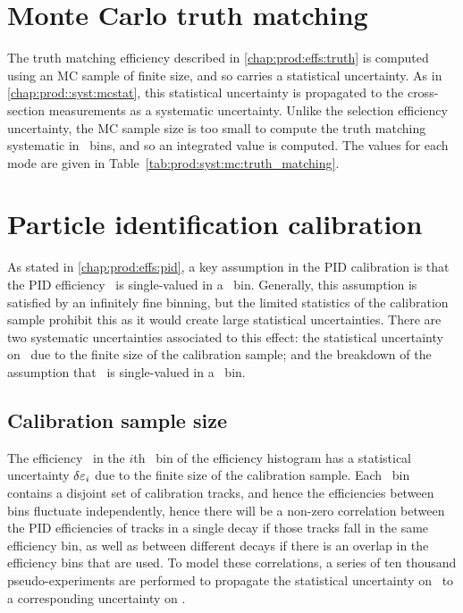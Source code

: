\section{Monte Carlo truth matching}
\label{chap:prod:syst:mc:truth_matching}

The truth matching efficiency described in \cref{chap:prod:effs:truth} is computed using an \ac{MC} 
sample of finite size, and so carries a statistical uncertainty.
As in \cref{chap:prod::syst:mcstat}, this statistical uncertainty is propagated to the cross-section 
measurements as a systematic uncertainty.
Unlike the selection efficiency uncertainty, the \ac{MC} sample size is too 
small to compute the truth matching systematic in \pTy\ bins, and so an 
integrated value is computed.
The values for each mode are given in Table~\ref{tab:prod:syst:mc:truth_matching}.

\section{Particle identification calibration}
\label{chap:prod:syst:pid}

As stated in \cref{chap:prod:effs:pid}, a key assumption in the \ac{PID} 
calibration is that the \ac{PID} efficiency \effpid\ is single-valued in a 
\ptotetanspd\ bin.
Generally, this assumption is satisfied by an infinitely fine binning, but the 
limited statistics of the calibration sample prohibit this as it would create 
large statistical uncertainties.
There are two systematic uncertainties associated to this effect: the 
statistical uncertainty on \effpid\ due to the finite size of the calibration 
sample; and the breakdown of the assumption that \effpid\ is single-valued in a 
\ptotetanspd\ bin.

\subsection{Calibration sample size}
\label{chap:prod:syst:pid:stat}

The efficiency \effi\ in the $i$th \ptotetanspd\ bin of the efficiency 
histogram has a statistical uncertainty $\delta{\ensuremath{\varepsilon_{i}}}$ due to the finite size of 
the calibration sample.
Each \ptotetanspd\ bin contains a disjoint set of calibration tracks, and hence 
the efficiencies between bins fluctuate independently, hence there will be a 
non-zero correlation between the \ac{PID} efficiencies of tracks in a single 
decay if those tracks fall in the same efficiency bin, as well as between 
different decays if there is an overlap in the efficiency bins that are used.
To model these correlations, a series of ten thousand pseudo-experiments are 
performed to propagate the statistical uncertainty on \effi\ to a corresponding 
uncertainty on \effpid.

